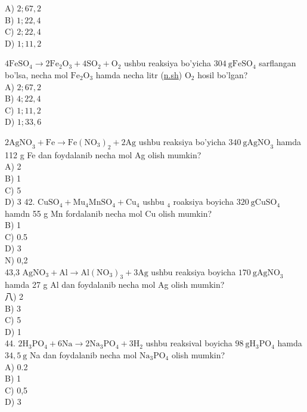 A) $2 ; 67,2$\\
B) $1 ; 22,4$\\
C) $2 ; 22,4$\\
D) $1 ; 11,2$
  \item $4 \mathrm{FeSO}_{4} \rightarrow 2 \mathrm{Fe}_{2} \mathrm{O}_{3}+4 \mathrm{SO}_{2}+\mathrm{O}_{2}$ ushbu reaksiya bo'yicha $304 \mathrm{~g} \mathrm{FeSO}_{4}$ sarflangan bo'lsa, necha mol $\mathrm{Fe}_{2} \mathrm{O}_{3}$ hamda necha litr (\href{http://n.sh}{n.sh}) $\mathrm{O}_{2}$ hosil bo'lgan?\\
A) $2 ; 67,2$\\
B) $4 ; 22,4$\\
C) $1 ; 11,2$\\
D) $1 ; 33,6$
  \item $2 \mathrm{AgNO}_{3}+\mathrm{Fe} \rightarrow \mathrm{Fe}\left(\mathrm{NO}_{3}\right)_{2}+2 \mathrm{Ag}$ ushbu reaksiya bo'yicha $340 \mathrm{~g} \mathrm{AgNO}_{3}$ hamda 112 g Fe dan foydalanib necha mol Ag olish mumkin?\\
A) 2\\
B) 1\\
C) 5\\
D) 3
42. $\mathrm{CuSO}_{4}+\mathrm{Mu}_{4} \mathrm{MnSO}_{4}+\mathrm{Cu}_{4}$ ushbu $_{4}$ roaksiya boyicha $320 \mathrm{~g} \mathrm{CuSO}_{4}$ hamdn 55 g Mn fordalanib necha mol Cu olish mumkin?\\
B) 1\\
C) 0.5\\
D) 3\\
N) 0,2\\
43,3 $\mathrm{Ag} \mathrm{NO}_{3}+\mathrm{Al} \rightarrow \mathrm{Al}\left(\mathrm{NO}_{3}\right)_{3}+3 \mathrm{Ag}$ ushbu reaksiya boyicha $170 \mathrm{~g} \mathrm{AgNO}_{3}$ hamda 27 g Al dan foydalanib necha mol Ag olish mumkin?\\
八) 2\\
B) 3\\
C) 5\\
D) 1\\
44. $2 \mathrm{H}_{3} \mathrm{PO}_{4}+6 \mathrm{Na} \rightarrow 2 \mathrm{Na}_{3} \mathrm{PO}_{4}+3 \mathrm{H}_{2}$ ushbu reaksival boyicha $98 \mathrm{~g} \mathrm{H}_{3} \mathrm{PO}_{4}$ hamda $34,5 \mathrm{~g}$ Na dan foydalanib necha mol $\mathrm{Na}_{3} \mathrm{PO}_{4}$ olish mumkin?\\
A) 0.2\\
B) 1\\
C) 0,5\\
D) 3\\
